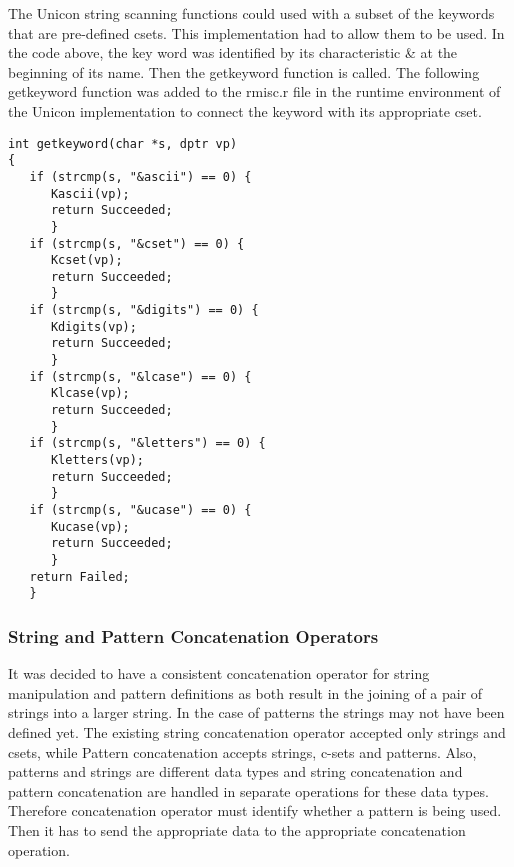 \documentclass{article}
\begin{document}
The Unicon string scanning functions could used with a subset of the keywords that are pre-defined csets.  This implementation had to allow them to be used.  In the code above, the key word was identified by its characteristic \& at the beginning of its name.  Then the getkeyword function is called.  The following getkeyword function was added to the rmisc.r file in the runtime environment of the Unicon implementation to connect the keyword with its appropriate cset.
\begin{verbatim}
int getkeyword(char *s, dptr vp)
{
   if (strcmp(s, "&ascii") == 0) {
      Kascii(vp);
      return Succeeded;
      }
   if (strcmp(s, "&cset") == 0) {
      Kcset(vp);
      return Succeeded;
      }
   if (strcmp(s, "&digits") == 0) {
      Kdigits(vp);
      return Succeeded;
      }
   if (strcmp(s, "&lcase") == 0) {
      Klcase(vp);
      return Succeeded;
      }
   if (strcmp(s, "&letters") == 0) {
      Kletters(vp);
      return Succeeded;
      }
   if (strcmp(s, "&ucase") == 0) {
      Kucase(vp);
      return Succeeded;
      }
   return Failed;
   }
\end{verbatim}

\subsubsection{String and Pattern Concatenation Operators}
It was decided to have a consistent concatenation operator for string manipulation and pattern definitions as both result in the joining of a pair of strings into a larger string.  In the case of patterns the strings may not have been defined yet.  The existing string concatenation operator accepted only strings and csets, while Pattern concatenation accepts strings, c-sets and patterns.  Also, patterns and strings are different data types and string concatenation and pattern concatenation are handled in separate operations for these data types.  Therefore concatenation operator must identify whether a pattern is being used.  Then it has to send the appropriate data to the appropriate concatenation operation.
\end{document}
